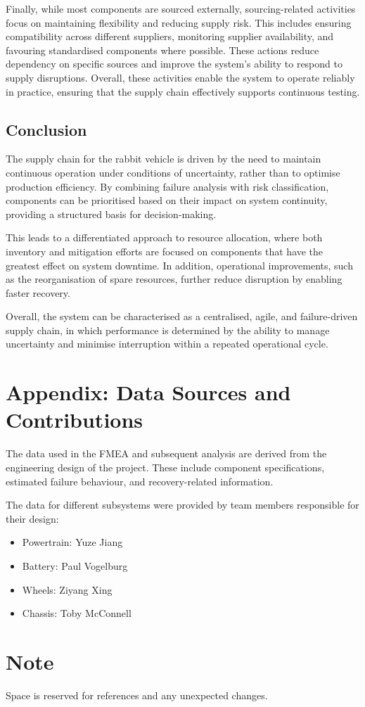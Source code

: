 \documentclass[a4paper,11pt]{article}
\begin{document}
Finally, while most components are sourced externally, sourcing-related activities focus on maintaining flexibility and reducing supply risk. This includes ensuring compatibility across different suppliers, monitoring supplier availability, and favouring standardised components where possible. These actions reduce dependency on specific sources and improve the system’s ability to respond to supply disruptions. Overall, these activities enable the system to operate reliably in practice, ensuring that the supply chain effectively supports continuous testing.

\subsection{Conclusion}

The supply chain for the rabbit vehicle is driven by the need to maintain continuous operation under conditions of uncertainty, rather than to optimise production efficiency. By combining failure analysis with risk classification, components can be prioritised based on their impact on system continuity, providing a structured basis for decision-making.

This leads to a differentiated approach to resource allocation, where both inventory and mitigation efforts are focused on components that have the greatest effect on system downtime. In addition, operational improvements, such as the reorganisation of spare resources, further reduce disruption by enabling faster recovery.

Overall, the system can be characterised as a centralised, agile, and failure-driven supply chain, in which performance is determined by the ability to manage uncertainty and minimise interruption within a repeated operational cycle.

\section*{Appendix: Data Sources and Contributions}

The data used in the FMEA and subsequent analysis are derived from the engineering design of the project. These include component specifications, estimated failure behaviour, and recovery-related information.

The data for different subsystems were provided by team members responsible for their design:

\begin{itemize}
    \item Powertrain: Yuze Jiang
    \item Battery: Paul Vogelburg
    \item Wheels: Ziyang Xing
    \item Chassis: Toby McConnell
\end{itemize}

\section*{Note}

Space is reserved for references and any unexpected changes.
\end{document}
